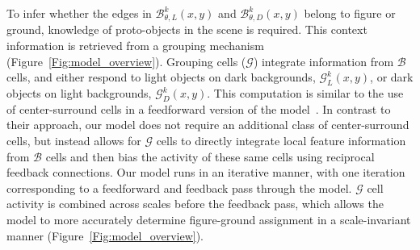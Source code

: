 \documentclass[12pt]{article}
\begin{document}
To infer whether the edges in $\mathcal{B}^k_{\theta,L}(x,y)$ and $\mathcal{B}^k_{\theta,D}(x,y)$ belong to
figure or ground, knowledge of proto-objects in the scene is required. This
context information is retrieved from a
grouping
mechanism (Figure~\ref{Fig:model_overview}). Grouping cells ($\mathcal{G}$) integrate information from
$\mathcal{B}$
cells, and 
either respond to light objects on dark backgrounds, $\mathcal{G}^k_{L}(x,y)$, or dark objects on light backgrounds, $\mathcal{G}^k_{D}(x,y)$. This computation is similar to the use of center-surround cells in a feedforward version of the model~\citep{Russell_etal14}. In contrast to their approach, our model does not require an additional class of center-surround cells, but instead allows for
$\mathcal{G}$ cells
to directly integrate local feature information from
$\mathcal{B}$
cells and then bias the activity of these same cells using reciprocal feedback connections. Our model runs in an iterative manner, with one iteration corresponding to a feedforward and feedback pass through the model.
$\mathcal{G}$
cell activity is combined across scales before the feedback pass, which allows the model to more accurately determine figure-ground assignment in a scale-invariant manner (Figure~\ref{Fig:model_overview}).
\end{document}
